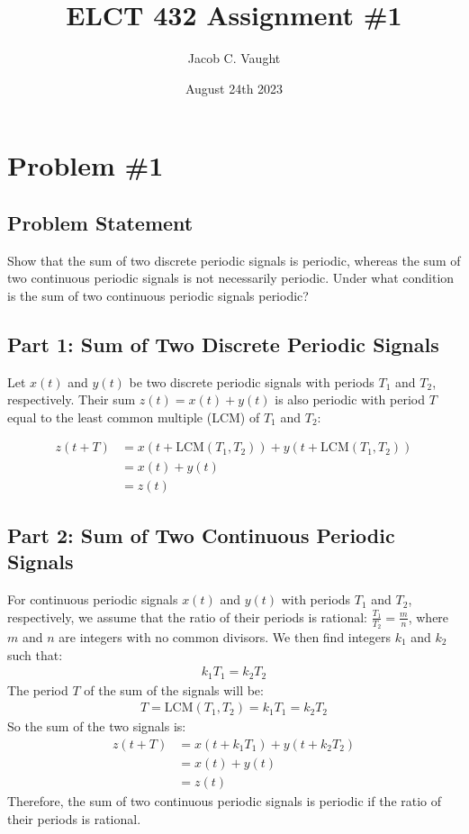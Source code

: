 \documentclass{article}
\title{ELCT 432 Assignment \#1}
\author{Jacob C. Vaught}
\date{August 24th 2023}
\begin{document}
\maketitle

\section*{Problem \#1}
\subsection*{Problem Statement}
Show that the sum of two discrete periodic signals is periodic, whereas the sum of two continuous periodic signals is not necessarily periodic. Under what condition is the sum of two continuous periodic signals periodic?

\subsection*{Part 1: Sum of Two Discrete Periodic Signals}

Let \( x(t) \) and \( y(t) \) be two discrete periodic signals with periods \( T_1 \) and \( T_2 \), respectively. Their sum \( z(t) = x(t) + y(t) \) is also periodic with period \( T \) equal to the least common multiple (LCM) of \( T_1 \) and \( T_2 \):

\begin{align*}
z(t + T) & = x(t + \text{LCM}(T_1, T_2)) + y(t + \text{LCM}(T_1, T_2)) \\
 & = x(t) + y(t) \\
 & = z(t)
\end{align*}

\subsection*{Part 2: Sum of Two Continuous Periodic Signals}

For continuous periodic signals \( x(t) \) and \( y(t) \) with periods \( T_1 \) and \( T_2 \), respectively, we assume that the ratio of their periods is rational: \( \frac{T_1}{T_2} = \frac{m}{n} \), where \( m \) and \( n \) are integers with no common divisors.
\newline \newline We then find integers \( k_1 \) and \( k_2 \) such that:
\begin{align*}
k_1 T_1 = k_2 T_2
\end{align*}
The period \( T \) of the sum of the signals will be:
\begin{align*}
T = \text{LCM}(T_1, T_2) = k_1 T_1 = k_2 T_2
\end{align*}
So the sum of the two signals is:
\begin{align*}
z(t + T) & = x(t + k_1 T_1) + y(t + k_2 T_2) \\
 & = x(t) + y(t) \\
 & = z(t)
\end{align*}
Therefore, the sum of two continuous periodic signals is periodic if the ratio of their periods is rational.
\end{document}

